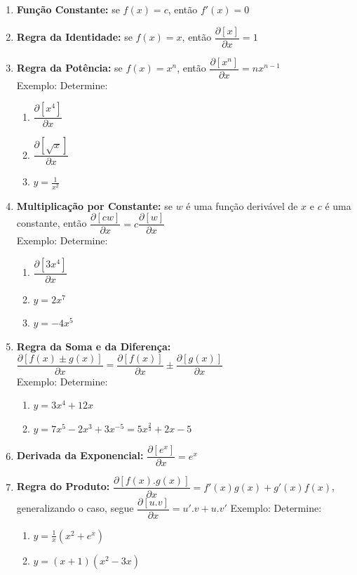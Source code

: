 \documentclass[oneside,a4paper,12pt]{article}
\begin{document}
\begin{enumerate}
	\item {\bf Função Constante:} se $f(x) = c$, então $f'(x) = 0$
	\vspace{150pt}
	\item {\bf Regra da Identidade:} se $f(x) = x$, então $\dfrac{\partial [x]}{\partial x} = 1$
	\vspace{150pt}
	\item {\bf Regra da Potência:} se $f(x) = x^n$, então $\dfrac{\partial [x^n]}{\partial x} = nx^{n-1}$ \\ Exemplo: Determine: \begin{enumerate}
		\item $\dfrac{\partial [x^4]}{\partial x}$
		\item $\dfrac{\partial [\sqrt{x}]}{\partial x}$
		\item $y=\frac{1}{x^2}$
	\end{enumerate}
	\newpage
	\item {\bf  Multiplicação por Constante:} se $w$ é uma função derivável de $x$ e $c$ é uma constante, então $\dfrac{\partial [cw]}{\partial x} = c \dfrac{\partial [w]}{\partial x}$
	\\ Exemplo: Determine: \begin{enumerate}
		\item $\dfrac{\partial [3x^4]}{\partial x}$
		\item $y = 2x^7$
		\item $y = -4x^5$
		\vspace{100pt}
	\end{enumerate}


	\item {\bf Regra da Soma e da Diferença:} $\dfrac{\partial [f(x) \pm g(x)]}{\partial x} = \dfrac{\partial [f(x)]}{\partial x} \pm \dfrac{\partial [g(x)]}{\partial x}$
	\\ Exemplo: Determine: \begin{enumerate}
		\item $y = 3x^4 + 12x$
		\item $y = 7x^5 - 2x^3 + 3x^{-5} = 5x^{\frac{2}{3}} + 2x - 5$
		\vspace{150pt}
	\end{enumerate}


	\item {\bf Derivada da Exponencial:} $\dfrac{\partial [e^x]}{\partial x} = e^x$
	\vspace{150pt}
	
	\item {\bf Regra do Produto:} $\dfrac{\partial [f(x).g(x)]}{\partial x} = f'(x)g(x)+g'(x)f(x)$, generalizando o caso, segue $\dfrac{\partial [u.v]}{\partial x} = u'.v+u.v'$
	\newpage
	Exemplo: Determine: \begin{enumerate}
		\item $y=\frac{1}{x}(x^2 + e^x)$
		\item $y=(x+1)(x^2-3x)$
		\vspace{200pt}
	\end{enumerate}


\end{enumerate}
\end{document}
